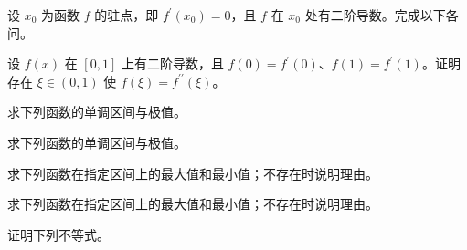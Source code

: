 \noindent\begin{minipage}{\textwidth}
设 $x_0$ 为函数 $f$ 的驻点，即 $f^{\prime}(x_0)=0$，且 $f$ 在 $x_0$ 处有二阶导数。完成以下各问。
\end{minipage}\par\vfill
\noindent\begin{minipage}{\textwidth}
设 $f(x)$ 在 $[0,1]$ 上有二阶导数，且 $f(0)=f^{\prime}(0)$、$f(1)=f^{\prime}(1)$。证明存在 $\xi\in(0,1)$ 使 $f(\xi)=f^{\prime\prime}(\xi)$。
\end{minipage}\par\vfill
\noindent\begin{minipage}{\textwidth}
求下列函数的单调区间与极值。
\end{minipage}\par\vfill
\newpage
\noindent\begin{minipage}{\textwidth}
求下列函数的单调区间与极值。
\end{minipage}\par\vfill
\noindent\begin{minipage}{\textwidth}
求下列函数在指定区间上的最大值和最小值；不存在时说明理由。
\end{minipage}\par\vfill
\noindent\begin{minipage}{\textwidth}
求下列函数在指定区间上的最大值和最小值；不存在时说明理由。
\end{minipage}\par\vfill
\noindent\begin{minipage}{\textwidth}
证明下列不等式。
\SubQ{1}{$\dfrac1{2^{p-1}}\le x^p+(1-x)^p\le1,\quad x\in(0,1],\ p>1$。}
\end{minipage}\par\vfill
